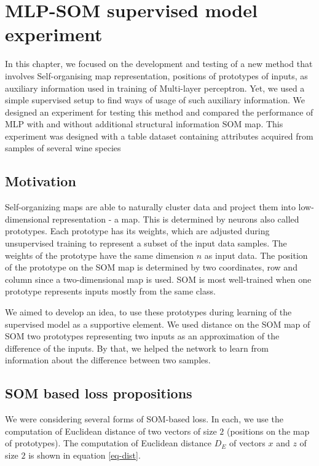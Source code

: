 \chapter{MLP-SOM supervised model experiment}
\label{chap:mlp-som}

In this chapter, we focused on the development and testing of a new method that involves Self-organising map representation, positions of prototypes of inputs, as auxiliary information used in training of Multi-layer perceptron. Yet, we used a simple supervised setup to find ways of usage of such auxiliary information. We designed an experiment for testing this method and compared the performance of MLP with and without additional structural information SOM map. This experiment was designed with a table dataset containing attributes acquired from samples of several wine species


\section{Motivation}
Self-organizing maps are able to naturally cluster data and project them into low-dimensional representation - a map. This is determined by neurons also called prototypes. Each prototype has its weights, which are adjusted during unsupervised training to represent a subset of the input data samples. The weights of the prototype have the same dimension $n$ as input data. The position of the prototype on the SOM map is determined by two coordinates, row and column since a two-dimensional map is used. SOM is most well-trained when one prototype represents inputs mostly from the same class.

We aimed to develop an idea, to use these prototypes during learning of the supervised model as a supportive element. We used distance on the SOM map of SOM two prototypes representing two inputs as an approximation of the difference of the inputs. By that, we helped the network to learn from information about the difference between two samples.

\newpage
\section{SOM based loss propositions}
We were considering several forms of SOM-based loss. In each, we use the computation of Euclidean distance of two vectors of size $2$ (positions on the map of prototypes). The computation of Euclidean distance $D_E$ of vectors $x$ and $z$ of size $2$  is shown in equation \ref{eq-dist}.

